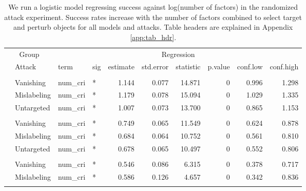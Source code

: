 \begin{longtable}[t]{llllrrrrrr}
\caption{\label{tab:num_cri_table}We run a logistic model regressing success against log(number of factors) in the randomized attack experiment. Success rates increase with the number of factors combined to select target and perturb objects for all models and attacks. Table headers are explained in Appendix \ref{app:tab_hdr}.}\\
\toprule
\multicolumn{2}{c}{Group} & \multicolumn{8}{c}{Regression} \\
\cmidrule(l{3pt}r{3pt}){1-2} \cmidrule(l{3pt}r{3pt}){3-10}
 & Attack & term & sig & estimate & std.error & statistic & p.value & conf.low & conf.high\\
\midrule
\addlinespace[0.3em]
\multicolumn{10}{l}{\textbf{YOLOv3}}\\
\hspace{1em} & Vanishing & num\_cri & * & 1.144 & 0.077 & 14.871 & 0 & 0.996 & 1.298\\
\cmidrule{2-10}\nopagebreak
\hspace{1em} & Mislabeling & num\_cri & * & 1.179 & 0.078 & 15.094 & 0 & 1.029 & 1.335\\
\cmidrule{2-10}\nopagebreak
\hspace{1em} & Untargeted & num\_cri & * & 1.007 & 0.073 & 13.700 & 0 & 0.865 & 1.153\\
\cmidrule{1-10}\pagebreak[0]
\addlinespace[0.3em]
\multicolumn{10}{l}{\textbf{SSD}}\\
\hspace{1em} & Vanishing & num\_cri & * & 0.749 & 0.065 & 11.549 & 0 & 0.624 & 0.878\\
\cmidrule{2-10}\nopagebreak
\hspace{1em} & Mislabeling & num\_cri & * & 0.684 & 0.064 & 10.752 & 0 & 0.561 & 0.810\\
\cmidrule{2-10}\nopagebreak
\hspace{1em} & Untargeted & num\_cri & * & 0.678 & 0.065 & 10.497 & 0 & 0.552 & 0.806\\
\cmidrule{1-10}\pagebreak[0]
\addlinespace[0.3em]
\multicolumn{10}{l}{\textbf{RetinaNet}}\\
\hspace{1em} & Vanishing & num\_cri & * & 0.546 & 0.086 & 6.315 & 0 & 0.378 & 0.717\\
\cmidrule{2-10}\nopagebreak
\hspace{1em} & Mislabeling & num\_cri & * & 0.586 & 0.126 & 4.657 & 0 & 0.342 & 0.836\\
\cmidrule{2-10}\nopagebreak

\end{longtable}
